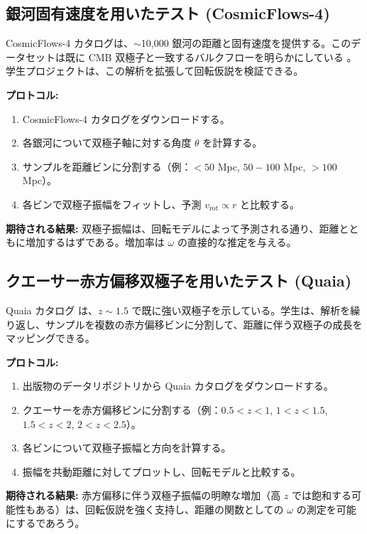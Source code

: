 \documentclass[11pt,a4paper]{article}
\begin{document}
	\subsection{銀河固有速度を用いたテスト (CosmicFlows-4)}
	
	CosmicFlows-4 カタログは、\(\sim\)10,000 銀河の距離と固有速度を提供する。このデータセットは既に CMB 双極子と一致するバルクフローを明らかにしている \cite{Watkins2023}。学生プロジェクトは、この解析を拡張して回転仮説を検証できる。
	
	\textbf{プロトコル:}
	\begin{enumerate}
		\item CosmicFlows-4 カタログをダウンロードする。
		\item 各銀河について双極子軸に対する角度 \(\theta\) を計算する。
		\item サンプルを距離ビンに分割する（例：\(<50\) Mpc, \(50-100\) Mpc, \(>100\) Mpc）。
		\item 各ビンで双極子振幅をフィットし、予測 \(v_{\mathrm{rot}} \propto r\) と比較する。
	\end{enumerate}
	
	\textbf{期待される結果:} 双極子振幅は、回転モデルによって予測される通り、距離とともに増加するはずである。増加率は \(\omega\) の直接的な推定を与える。
	
	\subsection{クエーサー赤方偏移双極子を用いたテスト (Quaia)}
	
	Quaia カタログ \cite{Secrest2025} は、\(z\sim1.5\) で既に強い双極子を示している。学生は、解析を繰り返し、サンプルを複数の赤方偏移ビンに分割して、距離に伴う双極子の成長をマッピングできる。
	
	\textbf{プロトコル:}
	\begin{enumerate}
		\item 出版物のデータリポジトリから Quaia カタログをダウンロードする。
		\item クエーサーを赤方偏移ビンに分割する（例：\(0.5<z<1\), \(1<z<1.5\), \(1.5<z<2\), \(2<z<2.5\)）。
		\item 各ビンについて双極子振幅と方向を計算する。
		\item 振幅を共動距離に対してプロットし、回転モデルと比較する。
	\end{enumerate}
	
	\textbf{期待される結果:} 赤方偏移に伴う双極子振幅の明瞭な増加（高 \(z\) では飽和する可能性もある）は、回転仮説を強く支持し、距離の関数としての \(\omega\) の測定を可能にするであろう。
	
\end{document}
